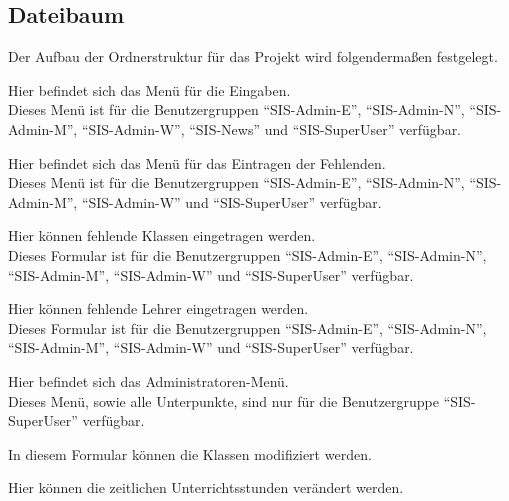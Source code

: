 \subsection{Dateibaum}
\label{sec:files}
Der Aufbau der Ordnerstruktur für das Projekt wird folgendermaßen festgelegt.

\begin{description}[style=nextline]
	\item[/backend/]
		Hier befindet sich das Menü für die Eingaben.\\
		Dieses Menü ist für die Benutzergruppen \enquote{SIS-Admin-E}, \enquote{SIS-Admin-N}, \enquote{SIS-Admin-M}, \enquote{SIS-Admin-W}, \enquote{SIS-News} und \enquote{SIS-SuperUser} verfügbar.
		\begin{description}[style=nextline]
			\item[./absentees/]
				Hier befindet sich das Menü für das Eintragen der Fehlenden.\\
				Dieses Menü ist für die Benutzergruppen \enquote{SIS-Admin-E}, \enquote{SIS-Admin-N}, \enquote{SIS-Admin-M}, \enquote{SIS-Admin-W} und \enquote{SIS-SuperUser} verfügbar.
				\begin{description}[style=nextline]
					\item[./classes/]
						Hier können fehlende Klassen eingetragen werden.\\
						Dieses Formular ist für die  Benutzergruppen \enquote{SIS-Admin-E}, \enquote{SIS-Admin-N}, \enquote{SIS-Admin-M}, \enquote{SIS-Admin-W} und \enquote{SIS-SuperUser} verfügbar.
					\item[./teachers/]
						Hier können fehlende Lehrer eingetragen werden.\\
						Dieses Formular ist für die  Benutzergruppen \enquote{SIS-Admin-E}, \enquote{SIS-Admin-N}, \enquote{SIS-Admin-M}, \enquote{SIS-Admin-W} und \enquote{SIS-SuperUser} verfügbar.
				\end{description}
				\item[./administration/]
					Hier befindet sich das Administratoren-Menü.\\
					Dieses Menü, sowie alle Unterpunkte, sind nur für die Benutzergruppe \enquote{SIS-SuperUser} verfügbar.
					\begin{description}[style=nextline]
						\item[./classes/]
							In diesem Formular können die Klassen modifiziert werden.
						\item[./hours/]
							Hier können die zeitlichen Unterrichtsstunden verändert werden.
						\item[./lessons/]

\end{description}
\end{description}
\end{description}
